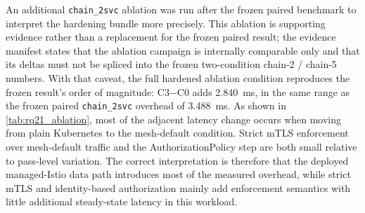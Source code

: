 \begin{table}[ht]
\centering
\caption[Stage~H1 communication-hardening ablation]{Stage~H1 \texttt{chain\_2svc} ablation of the communication-hardening bundle. Source: \texttt{merged/rq2\_1\_ablation\_summary.md} in \texttt{rq2\_1\_ablation\_20260516\_112348}. As documented in the evidence manifest, ablation deltas are internally comparable only and must not be spliced into the frozen two-condition paired result.}
\label{tab:rq21_ablation}
\end{table}

An additional \texttt{chain\_2svc} ablation was run after the frozen paired
benchmark to interpret the hardening bundle more precisely. This ablation is
supporting evidence rather than a replacement for the frozen paired result; the
evidence manifest states that the ablation campaign is internally comparable
only and that its deltas must not be spliced into the frozen two-condition
chain-2 / chain-5 numbers. With that caveat, the full hardened ablation
condition reproduces the frozen result's order of magnitude: C3$-$C0 adds
2.840~ms, in the same range as the frozen paired \texttt{chain\_2svc} overhead
of 3.488~ms. As shown in \cref{tab:rq21_ablation}, most of the adjacent latency
change occurs when moving from plain Kubernetes to the mesh-default condition.
Strict mTLS enforcement over mesh-default traffic and the AuthorizationPolicy
step are both small relative to pass-level variation. The correct
interpretation is therefore that the deployed managed-Istio data path
introduces most of the measured overhead, while strict mTLS and identity-based
authorization mainly add enforcement semantics with little additional
steady-state latency in this workload.

